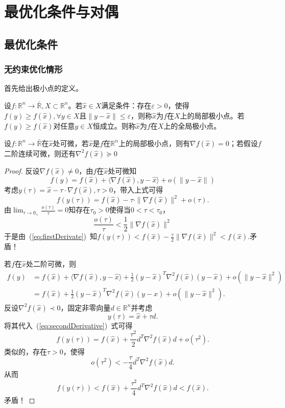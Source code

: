 \chapter{最优化条件与对偶}
\section{最优化条件}
\subsection{无约束优化情形}
首先给出极小点的定义。
\begin{definition}[极小点]
    设$f:\mathbb{R}^n\to\bar{\mathbb{R}},X\subset\mathbb{R}^n$。若$\hat{x}\in X$满足条件：存在$\varepsilon >0$，使得$f(y)\geq f(\hat{x}),\forall y\in X$且$\|y-\hat{x}\|\leq \varepsilon$，则称$\hat{x}$为$f$在$X$上的局部极小点。若$f(y)\geq f(\hat{x})$对任意$y\in X$恒成立。则称$\hat{x}$为$f$在$X$上的全局极小点。
\end{definition}
\begin{theorem}
    设$f:\mathbb{R}^n\to\bar{\mathbb{R}}$在$\hat{x}$处可微，若$\hat{x}$是$f$在$\mathbb{R}^n$上的局部极小点，则有$\nabla f(\hat{x})=0$；若假设$f$二阶连续可微，则还有$\nabla^{2}f(\hat{x})\succeq 0$
\end{theorem}
\begin{proof}
    反设$\nabla f(\hat{x})\neq 0$，由$f$在$\hat{x}$处可微知
    \[
        f(y) = f(\hat{x}) + \langle \nabla f(\hat{x}),y-\hat{x} \rangle + o(\|y-\hat{x}\|)
    \]
    考虑$y(\tau) = \hat{x}-\tau\cdot \nabla f(\hat{x}),\tau>0$，带入上式可得
    \begin{equation}\label{eq:firstDerivate}
        f(y(\tau))=f(\hat{x})-\tau\cdot\|\nabla f(\hat{x})\|^2+o(\tau).
    \end{equation}
    由$\lim_{\tau\to 0_+}\frac{o(\tau)}{\tau} = 0$知存在$\tau_0>0$使得当$0<\tau<\tau_0$，
    \[
        \dfrac{o(\tau)}{\tau}<\dfrac{1}{2}\|\nabla f(\hat{x})\|^2
    \]
    于是由~(\ref{eq:firstDerivate})~知$ f(y(\tau))<f(\hat{x})-\frac{\tau}{2}\|\nabla f(\hat{x})\|^2<f(\hat{x}). $矛盾！

    若$f$在$\hat{x}$处二阶可微，则
    \begin{equation}\label{eq:secondDerivative}
        \begin{aligned}
            f(y)& =f(\hat{x})+\langle\nabla f(\hat{x}),y-\hat{x}\rangle+\frac12(y-\hat{x})^T\nabla^2f(\hat{x})(y-\hat{x})+o(\|y-\hat{x}\|^2)  \\
            &=f(\hat{x})+\frac12(y-\hat{x})^T\nabla^2f(\hat{x})(y-\hat{x})+o(\|y-\hat{x}\|^2).
        \end{aligned}
    \end{equation}
    反设$\nabla^2f(\hat{x})\prec 0$，固定非零向量$d\in\mathbb{R}^n$并考虑
    \[
        y(\tau)=\hat{x}+\tau d.
    \]
    将其代入~(\ref{eq:secondDerivative})~式可得
    \[
        f(y(\tau))=f(\hat{x})+\frac{\tau^{2}}{2}d^{T}\nabla^{2}f(\hat{x})d+o(\tau^{2}).
    \]
    类似的，存在$\tau>0$，使得
    \[
        o(\tau^2)<-\frac{\tau}{4}d^T\nabla^2f(\hat{x})d.
    \]
    从而
    \[
        f(y(\tau))<f(\hat{x})+\frac{\tau^{2}}{4}d^{T}\nabla^{2}f(\hat{x})d<f(\hat{x}).
    \]
    矛盾！
\end{proof}
